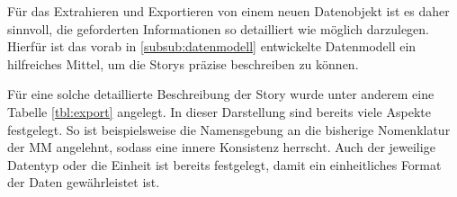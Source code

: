 Für das Extrahieren und Exportieren von einem neuen Datenobjekt ist es daher sinnvoll, die geforderten Informationen so detailliert wie möglich darzulegen.
Hierfür ist das vorab in \ref{subsub:datenmodell} entwickelte Datenmodell ein hilfreiches Mittel, um die Storys präzise beschreiben zu können.

\begin{table}[hbt]
\centering
{}
\caption[Gefordertes Exportformat am Beispiel der CPR-Daten]{Auf Basis des entworfenen Datenmodells erstellte Tabelle für das geforderte Export-Format am Beispiel von \gls{CPR}-Daten}
\label{tbl:export}
\end{table}

Für eine solche detaillierte Beschreibung der Story wurde unter anderem eine Tabelle \ref{tbl:export} angelegt.
In dieser Darstellung sind bereits viele Aspekte festgelegt.
So ist beispielsweise die Namensgebung an die bisherige Nomenklatur der \gls{MM} angelehnt, sodass eine innere Konsistenz herrscht.
Auch der jeweilige Datentyp oder die Einheit ist bereits festgelegt, damit ein einheitliches Format der Daten gewährleistet ist.

